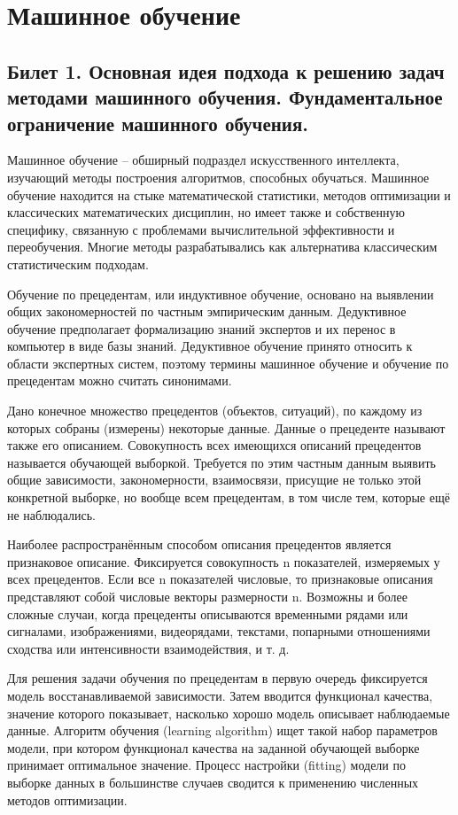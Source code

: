 \documentclass[a4paper, 12pt]{article}
\begin{document}
	\section*{Машинное обучение}
	\subsection*{Билет 1. Основная идея подхода к решению задач методами машинного обучения. Фундаментальное ограничение машинного обучения.}
	Машинное обучение -- обширный подраздел искусственного интеллекта, изучающий методы построения алгоритмов, способных обучаться. Машинное обучение находится на стыке математической статистики, методов оптимизации и классических математических дисциплин, но имеет также и собственную специфику, связанную с проблемами вычислительной эффективности и переобучения. Многие методы разрабатывались как альтернатива классическим статистическим подходам. 
	
	Обучение по прецедентам, или индуктивное обучение, основано на выявлении общих закономерностей по частным эмпирическим данным. Дедуктивное обучение предполагает формализацию знаний экспертов и их перенос в компьютер в виде базы знаний. Дедуктивное обучение принято относить к области экспертных систем, поэтому термины машинное обучение и обучение по прецедентам можно считать синонимами.
	
	Дано конечное множество прецедентов (объектов, ситуаций), по каждому из которых собраны (измерены) некоторые данные. Данные о прецеденте называют также его описанием. Совокупность всех имеющихся описаний прецедентов называется обучающей выборкой. Требуется по этим частным данным выявить общие зависимости, закономерности, взаимосвязи, присущие не только этой конкретной выборке, но вообще всем прецедентам, в том числе тем, которые ещё не наблюдались.
	
	Наиболее распространённым способом описания прецедентов является признаковое описание. Фиксируется совокупность n показателей, измеряемых у всех прецедентов. Если все n показателей числовые, то признаковые описания представляют собой числовые векторы размерности n. Возможны и более сложные случаи, когда прецеденты описываются временными рядами или сигналами, изображениями, видеорядами, текстами, попарными отношениями сходства или интенсивности взаимодействия, и т. д.
	
	Для решения задачи обучения по прецедентам в первую очередь фиксируется модель восстанавливаемой зависимости. Затем вводится функционал качества, значение которого показывает, насколько хорошо модель описывает наблюдаемые данные. Алгоритм обучения (learning algorithm) ищет такой набор параметров модели, при котором функционал качества на заданной обучающей выборке принимает оптимальное значение. Процесс настройки (fitting) модели по выборке данных в большинстве случаев сводится к применению численных методов оптимизации.
	
\end{document}
